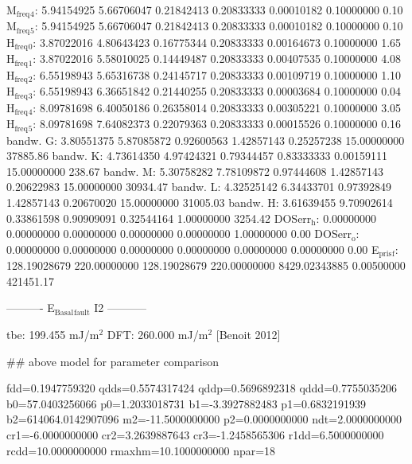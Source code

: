 \documentclass[11pt]{article}
\begin{document}
M\(_{\text{freq}}\)\(_{\text{4}}\):   5.94154925   5.66706047   0.21842413   0.20833333   0.00010182   0.10000000         0.10
M\(_{\text{freq}}\)\(_{\text{5}}\):   5.94154925   5.66706047   0.21842413   0.20833333   0.00010182   0.10000000         0.10
H\(_{\text{freq}}\)\(_{\text{0}}\):   3.87022016   4.80643423   0.16775344   0.20833333   0.00164673   0.10000000         1.65
H\(_{\text{freq}}\)\(_{\text{1}}\):   3.87022016   5.58010025   0.14449487   0.20833333   0.00407535   0.10000000         4.08
H\(_{\text{freq}}\)\(_{\text{2}}\):   6.55198943   5.65316738   0.24145717   0.20833333   0.00109719   0.10000000         1.10
H\(_{\text{freq}}\)\(_{\text{3}}\):   6.55198943   6.36651842   0.21440255   0.20833333   0.00003684   0.10000000         0.04
H\(_{\text{freq}}\)\(_{\text{4}}\):   8.09781698   6.40050186   0.26358014   0.20833333   0.00305221   0.10000000         3.05
H\(_{\text{freq}}\)\(_{\text{5}}\):   8.09781698   7.64082373   0.22079363   0.20833333   0.00015526   0.10000000         0.16
bandw. G:   3.80551375   5.87085872   0.92600563   1.42857143   0.25257238  15.00000000     37885.86
bandw. K:   4.73614350   4.97424321   0.79344457   0.83333333   0.00159111  15.00000000       238.67
bandw. M:   5.30758282   7.78109872   0.97444608   1.42857143   0.20622983  15.00000000     30934.47
bandw. L:   4.32525142   6.34433701   0.97392849   1.42857143   0.20670020  15.00000000     31005.03
bandw. H:   3.61639455   9.70902614   0.33861598   0.90909091   0.32544164   1.00000000      3254.42
DOSerr\(_{\text{h}}\):   0.00000000   0.00000000   0.00000000   0.00000000   0.00000000   1.00000000         0.00
DOSerr\(_{\text{o}}\):   0.00000000   0.00000000   0.00000000   0.00000000   0.00000000   0.00000000         0.00
E\(_{\text{pris}}\)\(_{\text{f}}\): 128.19028679 220.00000000 128.19028679 220.00000000 8429.02343885   0.00500000    421451.17

----------     E\(_{\text{Basal}}\)\(_{\text{fault}}\) I2     -----------

tbe:       199.455 mJ/m\(^{\text{2}}\)
DFT:       260.000 mJ/m\(^{\text{2}}\) [Benoit  2012]


\#\# above model for parameter comparison 

fdd=0.1947759320 qdds=0.5574317424 qddp=0.5696892318 qddd=0.7755035206 b0=57.0403256066 p0=1.2033018731 b1=-3.3927882483 p1=0.6832191939 b2=614064.0142907096 m2=-11.5000000000 p2=0.0000000000 ndt=2.0000000000 cr1=-6.0000000000 cr2=3.2639887643 cr3=-1.2458565306 r1dd=6.5000000000 rcdd=10.0000000000 rmaxhm=10.1000000000 npar=18 
\end{document}
